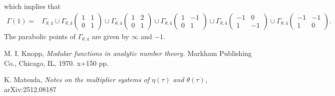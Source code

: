 \documentclass[12pt]{article}
\theoremstyle{definition}
\numberwithin{equation}{section}
\numberwithin{theorem}{section}
\begin{document}
which implies that 
\begin{align*}
\Gamma(1)=&
\Gamma_{\theta,4} 
\cup
\Gamma_{\theta,4} 
\begin{pmatrix}
1 & 1 \\
0 & 1
\end{pmatrix} 
\cup
\Gamma_{\theta,4} 
\begin{pmatrix}
1 & 2 \\
0 & 1
\end{pmatrix} 
\cup
\Gamma_{\theta,4} 
\begin{pmatrix}
1 & -1 \\
0 & 1
\end{pmatrix} 
\cup
\Gamma_{\theta,4} 
\begin{pmatrix}
-1 & 0 \\
1& -1
\end{pmatrix} 
\cup
\Gamma_{\theta,4} 
\begin{pmatrix}
-1 & -1 \\
1 & 0
\end{pmatrix}. 
\end{align*}
The parabolic points of $\Gamma_{\theta,4}$ are given by $\infty$ and $-1.$ 
















\begin{thebibliography}{}
%
%








M. I. Knopp,
{\it Modular functions in analytic number theory.}
Markham Publishing Co., Chicago, IL, 1970. x+150 pp.



K. Matsuda, 
{\it 
Notes on the multiplier systems of $\eta(\tau)$ and $\theta(\tau)$,
}
arXiv:2512.08187

 
\end{thebibliography}
\end{document}
